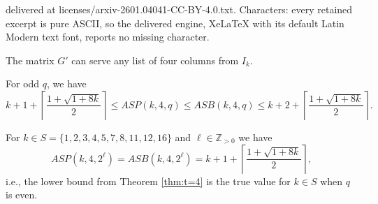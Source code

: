 \documentclass[10pt,a4paper]{amsart}
\newcommand{\Z}{\mathbb{Z}}
\begin{document}
delivered at licenses/arxiv-2601.04041-CC-BY-4.0.txt. Characters: every retained excerpt is pure ASCII, so the delivered engine, XeLaTeX with its default Latin Modern text font, reports no missing character.
\begin{lemma}\label{Lem:G'IsBatch}
    The matrix $G'$ can serve any list of four columns from $I_k$.
\end{lemma}

\begin{theorem} \label{thm:t=4} 
    For odd $q$, we have
    $$
        k+1 + \left\lceil \frac{1 + \sqrt{1 + 8k}}{2}\right\rceil \leq ASP(k,4,q) \leq ASB(k,4,q) \leq k+2 + \left\lceil \frac{1 + \sqrt{1 + 8k}}{2}\right\rceil.
    $$
\end{theorem}

\begin{proposition} \label{prop:t=4_q=2} 
    For $k \in S =\{1,2,3,4,5,7,8,11,12,16\}$ and $\ell \in \Z_{>0}$ we have 
    $$
        ASP(k,4,2^\ell)=ASB(k,4,2^\ell)= k+1 + \left\lceil \frac{1 + \sqrt{1 + 8k}}{2}\right\rceil,
    $$
    i.e., the lower bound from Theorem \ref{thm:t=4} is the true value for $k \in S$ when $q$ is even. 
\end{proposition}
\end{document}
